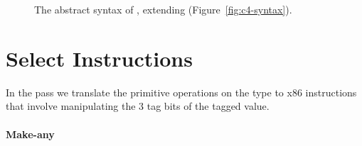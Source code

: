 \documentclass[7x10]{TimesAPriori_MIT}%
\newcommand{\gray}[1]{{\color{gray} #1}}
\begin{document}
\begin{figure}[tp]
\fbox{
\begin{minipage}{0.96\textwidth}
\small
\[
\begin{array}{lcl}
\Exp &::= & \ldots
   \MID \BINOP{\key{'any-vector-ref}}{\Atm}{\Atm}  \\
   &\MID& (\key{Prim}~\key{'any-vector-set!}\,(\key{list}\,\Atm\,\Atm\,\Atm))\\
   &\MID& \VALUEOF{\Exp}{\FType} \\
\Stmt &::=& \gray{ \ASSIGN{\VAR{\Var}}{\Exp} 
  \MID \LP\key{Collect} \,\itm{int}\RP }\\
\Tail &::= & \gray{ \RETURN{\Exp} \MID \SEQ{\Stmt}{\Tail} 
       \MID \GOTO{\itm{label}} } \\
    &\MID& \gray{ \IFSTMT{\BINOP{\itm{cmp}}{\Atm}{\Atm}}{\GOTO{\itm{label}}}{\GOTO{\itm{label}}}  }\\
&\MID& \gray{ \TAILCALL{\Atm}{\Atm\ldots} } 
  \MID \LP\key{Exit}\RP \\
\Def &::=& \gray{ \DEF{\itm{label}}{\LP[\Var\key{:}\Type]\ldots\RP}{\Type}{\itm{info}}{\LP\LP\itm{label}\,\key{.}\,\Tail\RP\ldots\RP} }\\
\LangCAnyM{} & ::= & \gray{ \PROGRAMDEFS{\itm{info}}{\LP\Def\ldots\RP} }
\end{array}
\]
\end{minipage}
}
\caption{The abstract syntax of \LangCAny{}, extending \LangCLam{} (Figure~\ref{fig:c4-syntax}).}
\label{fig:c5-syntax}
\end{figure}


\section{Select Instructions}
\label{sec:select-Rany}

In the  pass we translate the primitive
operations on the  type to x86 instructions that involve
manipulating the 3 tag bits of the tagged value.

\paragraph{Make-any}
\end{document}
